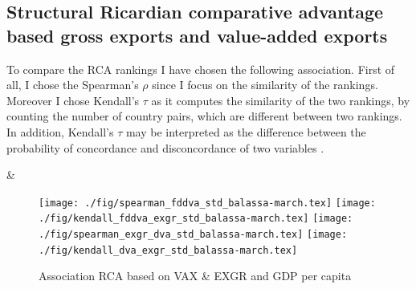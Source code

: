 \subsection{Structural Ricardian comparative advantage based gross exports and value-added exports}
To compare the RCA rankings I have chosen the following association.
First of all, I chose the Spearman's $\rho$  since I focus on the similarity of the rankings.
Moreover I chose Kendall's $\tau$ as it computes the similarity of the two rankings, by counting the number of country pairs, which are different between two rankings.
In addition, Kendall's  $\tau$ may be interpreted as the difference between the probability of concordance and disconcordance of two variables .
\par &
\begin{figure}[H]
\caption{Association RCA based on VAX \& EXGR and GDP per capita }
\centering
\texttt{[image: ./fig/spearman\_fddva\_std\_balassa-march.tex]}
\texttt{[image: ./fig/kendall\_fddva\_exgr\_std\_balassa-march.tex]}
\texttt{[image: ./fig/spearman\_exgr\_dva\_std\_balassa-march.tex]}
\texttt{[image: ./fig/kendall\_dva\_exgr\_std\_balassa-march.tex]}
\end{figure}
